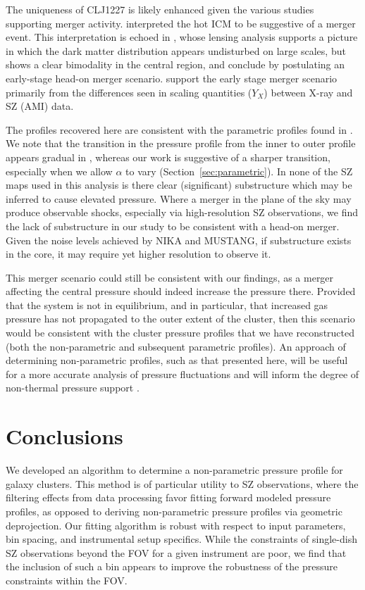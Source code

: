 \documentclass[onecolumn,traditabstract]{aa}
\begin{document}
The uniqueness of CLJ1227 is likely enhanced given the various studies supporting merger activity. \citet{maughan2007} interpreted the hot ICM to be suggestive of a merger event. This interpretation is echoed in \citet{jee2009a}, whose lensing analysis supports a picture in which the dark matter distribution appears undisturbed on large scales, but shows a clear bimodality in the central region, and conclude by postulating an early-stage head-on merger scenario. \citet{rumsey2016} support the early stage merger scenario primarily from the differences seen in scaling quantities ($Y_X$) between X-ray and SZ (AMI) data.

The profiles recovered here are consistent with the parametric profiles found in \citet{adam2015}. We note that the transition in the pressure profile from the inner to outer profile appears gradual in \citet{adam2015}, whereas our work is suggestive of a sharper transition, especially when we allow $\alpha$ to vary (Section~\ref{sec:parametric}). In none of the SZ maps used in this analysis is there clear (significant) substructure which may be inferred to cause elevated pressure. Where a merger in the plane of the sky may produce observable shocks, especially via high-resolution SZ observations, we find the lack of substructure in our study to be consistent with a head-on merger. Given the noise levels achieved by NIKA and MUSTANG, if substructure exists in the core, it may require yet higher resolution to observe it.

This merger scenario could still be consistent with our findings, as a merger affecting the central pressure should indeed
increase the pressure there. Provided that the system is not in equilibrium, and in particular, that increased gas pressure
has not propagated to the outer extent of the cluster, then this scenario would be consistent with the cluster pressure profiles
that we have reconstructed (both the non-parametric and subsequent parametric profiles). An approach of determining non-parametric
profiles, such as that presented here, will be useful for a more accurate analysis of pressure fluctuations and will inform
the degree of non-thermal pressure support \citep[e.g.,][]{khatri2016}.

\section{Conclusions}
\label{sec:conclusions}

We developed an algorithm to determine a non-parametric pressure profile for galaxy clusters.
This method is of particular utility to SZ observations, where the filtering effects from data
processing favor fitting forward modeled pressure profiles, as opposed to deriving non-parametric pressure profiles via
geometric deprojection. Our fitting algorithm is robust with respect to input parameters,
bin spacing, and instrumental setup specifics. While the constraints of single-dish SZ observations
beyond the FOV for a given instrument are poor, we find that the inclusion of such a bin
appears to improve the robustness of the pressure constraints within the FOV.
\end{document}
